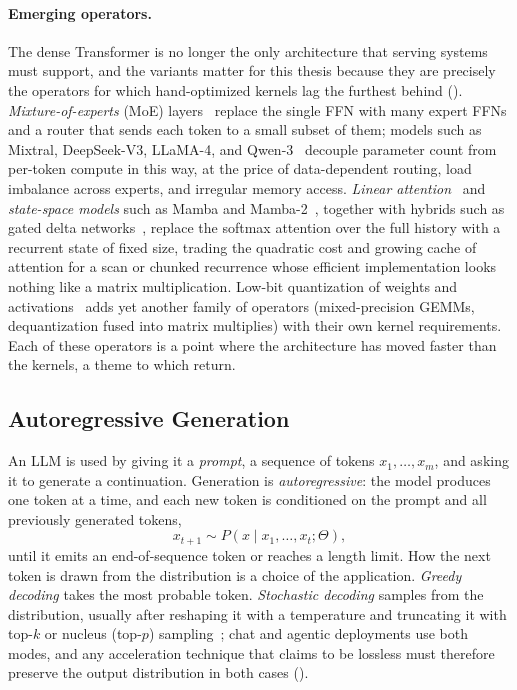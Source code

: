 \paragraph{Emerging operators.}
The dense Transformer is no longer the only architecture that serving systems must support, and the variants matter for this thesis because they are precisely the operators for which hand-optimized kernels lag the furthest behind ().
\emph{Mixture-of-experts} (MoE) layers~\cite{shazeer2017outrageously,fedus2022switch} replace the single FFN with many expert FFNs and a router that sends each token to a small subset of them; models such as Mixtral, DeepSeek-V3, LLaMA-4, and Qwen-3~\cite{jiang2024mixtral,deepseekai2024deepseekv3,llama4,yang2025qwen3technicalreport} decouple parameter count from per-token compute in this way, at the price of data-dependent routing, load imbalance across experts, and irregular memory access.
\emph{Linear attention}~\cite{katharopoulos2020transformers} and \emph{state-space models} such as Mamba and Mamba-2~\cite{gu2023mamba,mamba2}, together with hybrids such as gated delta networks~\cite{yang2025gated}, replace the softmax attention over the full history with a recurrent state of fixed size, trading the quadratic cost and growing cache of attention for a scan or chunked recurrence whose efficient implementation looks nothing like a matrix multiplication.
Low-bit quantization of weights and activations~\cite{xiao2022smoothquant,frantar2023gptq,dettmers2022gpt3} adds yet another family of operators (mixed-precision GEMMs, dequantization fused into matrix multiplies) with their own kernel requirements.
Each of these operators is a point where the architecture has moved faster than the kernels, a theme to which  return.

\subsection{Autoregressive Generation}
\label{background:subsec:autoregressive}

An LLM is used by giving it a \emph{prompt}, a sequence of tokens $x_1, \ldots, x_m$, and asking it to generate a continuation.
Generation is \emph{autoregressive}: the model produces one token at a time, and each new token is conditioned on the prompt and all previously generated tokens,
\[
x_{t+1} \sim P(x \mid x_1, \ldots, x_t; \Theta),
\]
until it emits an end-of-sequence token or reaches a length limit.
How the next token is drawn from the distribution is a choice of the application.
\emph{Greedy decoding} takes the most probable token.
\emph{Stochastic decoding} samples from the distribution, usually after reshaping it with a temperature and truncating it with top-$k$ or nucleus (top-$p$) sampling~\cite{holtzman2020curious}; chat and agentic deployments use both modes, and any acceleration technique that claims to be lossless must therefore preserve the output distribution in both cases ().

